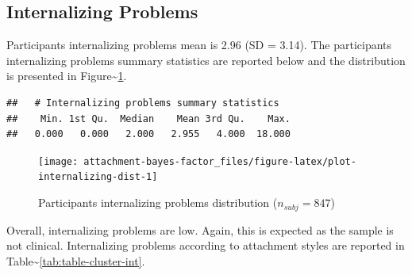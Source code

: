 \documentclass[
]{book}
\begin{document}
\hypertarget{internalizing-problems-1}{%
\subsection{Internalizing Problems}\label{internalizing-problems-1}}

Participants internalizing problems mean is 2.96 (SD = 3.14). The participants internalizing problems summary statistics are reported below and the distribution is presented in Figure\textasciitilde\ref{fig:plot-internalizing-dist}.

\begin{verbatim}
##   # Internalizing problems summary statistics
##    Min. 1st Qu.  Median    Mean 3rd Qu.    Max. 
##   0.000   0.000   2.000   2.955   4.000  18.000
\end{verbatim}

\begin{figure}

{\centering \texttt{[image: attachment-bayes-factor\_files/figure-latex/plot-internalizing-dist-1]} 

}

\caption{Participants internalizing problems distribution ($n_{subj} = 847$)}\label{fig:plot-internalizing-dist}
\end{figure}

Overall, internalizing problems are low. Again, this is expected as the sample is not clinical. Internalizing problems according to attachment styles are reported in Table\textasciitilde\ref{tab:table-cluster-int}.
\end{document}
